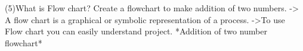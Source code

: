 (5)What is Flow chart? Create a flowchart to make addition of two numbers.
-> A flow chart is a graphical or symbolic representation of a process.
->To use Flow chart you can easily understand project.
                *Addition of two number flowchart*



 